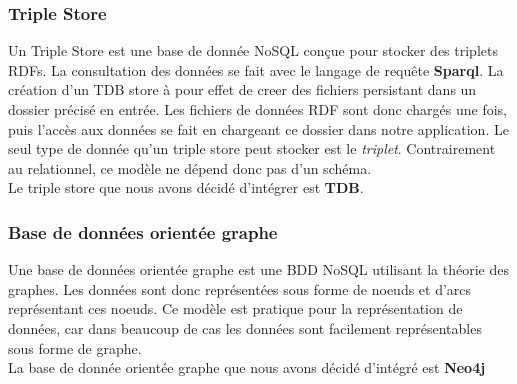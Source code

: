 \documentclass{article}
\begin{document}
\subsubsection{Triple Store}
Un Triple Store est une base de donnée NoSQL conçue pour stocker des triplets RDFs. La consultation des données se fait avec le langage de requête \textbf{Sparql}. 
La création d'un TDB store à pour effet de creer des fichiers persistant dans un dossier précisé en entrée. Les fichiers de données RDF sont donc chargés une fois, puis l'accès aux données se fait en chargeant ce dossier dans notre application. Le seul type de donnée qu'un triple store peut stocker est le \textit{triplet}. Contrairement au relationnel, ce modèle ne dépend donc pas d'un schéma.\\
Le triple store que nous avons décidé d'intégrer est \textbf{TDB}.
\subsubsection{Base de données orientée graphe}
Une base de données orientée graphe est une BDD NoSQL utilisant la théorie des graphes. Les données sont donc représentées sous forme de noeuds et d'arcs représentant ces noeuds. Ce modèle est pratique pour la représentation de données, car dans beaucoup de cas les données sont facilement représentables sous forme de graphe.\\
La base de donnée orientée graphe que nous avons décidé d'intégré est \textbf{Neo4j}
\end{document}
